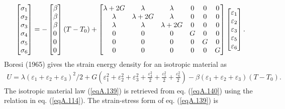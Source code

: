 \documentclass{AeroStructure-ERJohnson}
\begin{document}
\begin{align}\label{eqA.139}
\left[\begin{array}{@{}l@{}}\sigma_{1} \\\sigma_{2} \\\sigma_{3} \\\sigma_{4} \\\sigma_{5} \\\sigma_{6}\end{array}\right]=-\left[\begin{array}{@{}l@{}}\beta \\\beta \\\beta \\0 \\0 \\0\end{array}\right](T-T_{0})+\left[\begin{array}{@{}cccccc@{}}\lambda+2 G & \lambda & \lambda & 0 & 0 & 0 \\\lambda & \lambda+2 G & \lambda & 0 & 0 & 0 \\\lambda & \lambda & \lambda+2 G & 0 & 0 & 0 \\0 & 0 & 0 & G & 0 & 0 \\0 & 0 & 0 & 0 & G & 0 \\0 & 0 & 0 & 0 & 0 & G\end{array}\right]\left[\begin{array}{@{}l@{}}\varepsilon_{1} \\\varepsilon_{2} \\\varepsilon_{3} \\\varepsilon_{5} \\\varepsilon_{6}\end{array}\right].
\end{align}
Boresi (1965) gives the strain energy density for an isotropic material as
\begin{align}\label{eqA.140}
U=\lambda\left(\varepsilon_{1}+\varepsilon_{2}+\varepsilon_{3}\right)^{2} / 2+G\left(\varepsilon_{1}^{2}+\varepsilon_{2}^{2}+\varepsilon_{3}^{2}+\frac{\varepsilon_{4}^{2}}{2}+\frac{\varepsilon_{5}^{2}}{2}+\frac{\varepsilon_{6}^{2}}{2}\right)-\beta\left(\varepsilon_{1}+\varepsilon_{2}+\varepsilon_{3}\right)(T-T_{0}).
\end{align}
The isotropic material law (\ref{eqA.139}) is retrieved from eq. (\ref{eqA.140}) using the relation in eq. (\ref{eqA.114}). The strain-stress form of eq. (\ref{eqA.139}) is
\end{document}
